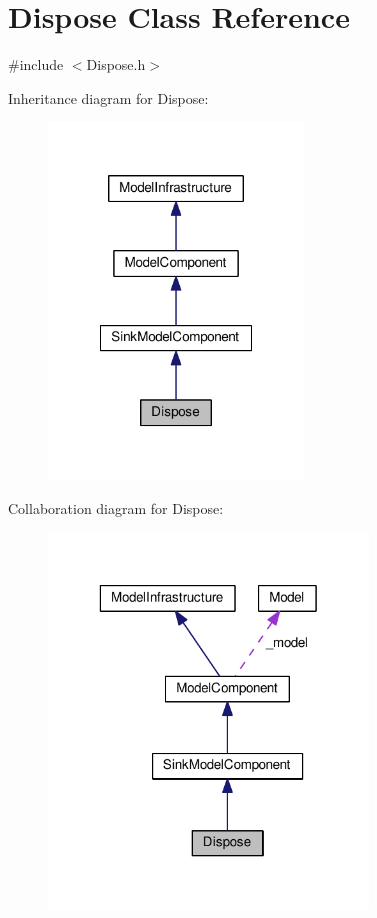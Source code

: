 \hypertarget{class_dispose}{\section{Dispose Class Reference}
\label{class_dispose}
}


{\ttfamily \#include $<$Dispose.\-h$>$}



Inheritance diagram for Dispose\-:
\nopagebreak
\begin{figure}[H]
\begin{center}
\leavevmode
\includegraphics[width=192pt]{class_dispose__inherit__graph}
\end{center}
\end{figure}


Collaboration diagram for Dispose\-:
\nopagebreak
\begin{figure}[H]
\begin{center}
\leavevmode
\includegraphics[width=241pt]{class_dispose__coll__graph}
\end{center}
\end{figure}
